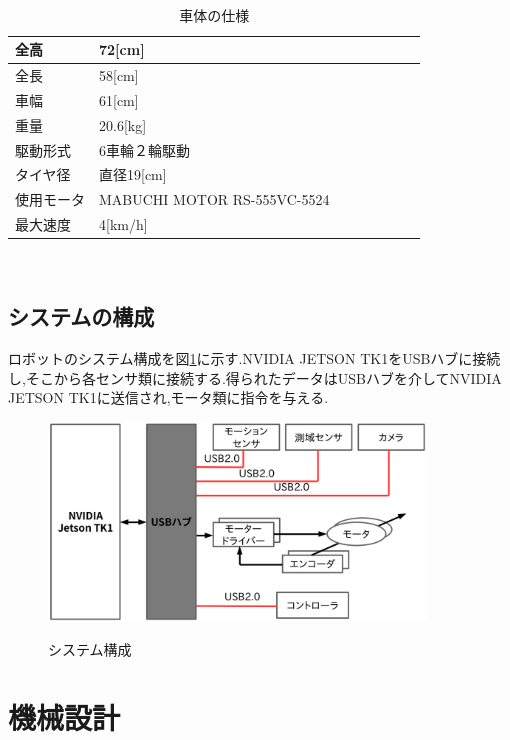 \documentclass[12pt,oneside]{sotsuken_paper}
\begin{document}
\begin{table}[htp] 
 　\begin{center} 
    \caption{車体の仕様} 
  \begin{tabular}{|l|l|l|l|l|l|l|l|} \hline 
全高 & 72[cm] \\  \hline 
全長 & 58[cm] \\ \hline 
車幅 & 61[cm] \\ \hline 
重量 & 20.6[kg] \\ \hline 
駆動形式 & 6車輪２輪駆動 \\ \hline 
タイヤ径 & 直径19[cm] \\ \hline 
使用モータ &  MABUCHI MOTOR RS-555VC-5524\\ \hline 
最大速度 & 4[km/h] \\ \hline 
  \end{tabular} 
　   \label{tab:siyou} 
  \end{center} 
\end{table} 



\subsection{システムの構成} 
ロボットのシステム構成を図\ref{fig:sisutemu}に示す.NVIDIA JETSON TK1をUSBハブに接続し,そこから各センサ類に接続する.得られたデータはUSBハブを介してNVIDIA JETSON TK1に送信され,モータ類に指令を与える. 
\begin{figure}[htp] 
 \begin{center} 
  \includegraphics[width=100mm]{img/hard/sisutemu.png} 
 　\caption{システム構成} 
  \label{fig:sisutemu}%
 \end{center} 
\end{figure} 




\section{機械設計}
\newpage 
\end{document}
